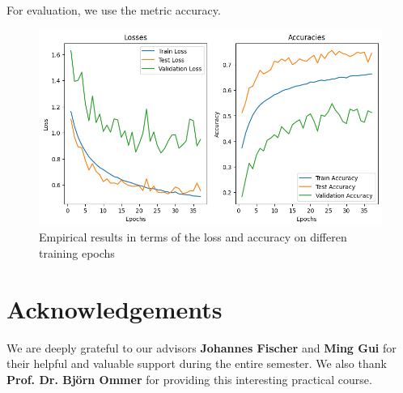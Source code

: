 For evaluation, we use the metric accuracy.

\begin{figure}[ht]
  \centering
   \includegraphics[width=0.95\linewidth]{output.png}
   \caption{Empirical results in terms of the loss and accuracy on differen training epochs}
   \label{fig:result}
\end{figure}

\section*{Acknowledgements}

We are deeply grateful to our advisors \textbf{Johannes Fischer} and \textbf{Ming Gui} for their helpful and valuable support during the entire semester. 
We also thank \textbf{Prof. Dr. Björn Ommer} for providing this interesting practical course.